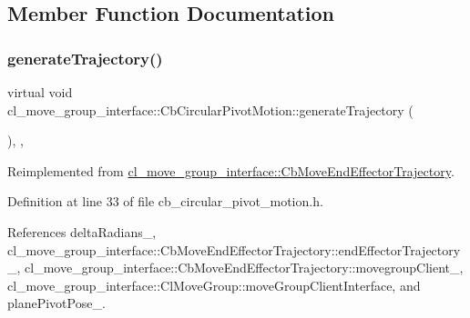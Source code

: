 \subsection{Member Function Documentation}
\mbox{\label{classcl__move__group__interface_1_1CbCircularPivotMotion_a7ff4ffd989cda695adc44a5a42eb3a18}} 
\subsubsection{\texorpdfstring{generate\+Trajectory()}{generateTrajectory()}}
{\footnotesize\ttfamily virtual void cl\+\_\+move\+\_\+group\+\_\+interface\+::\+Cb\+Circular\+Pivot\+Motion\+::generate\+Trajectory (\begin{DoxyParamCaption}{ }\end{DoxyParamCaption})\hspace{0.3cm}{\ttfamily [inline]}, {\ttfamily [override]}, {\ttfamily [virtual]}}



Reimplemented from \hyperlink{classcl__move__group__interface_1_1CbMoveEndEffectorTrajectory_aeae938ab66e18ab7d2fb2427bc83647b}{cl\+\_\+move\+\_\+group\+\_\+interface\+::\+Cb\+Move\+End\+Effector\+Trajectory}.



Definition at line 33 of file cb\+\_\+circular\+\_\+pivot\+\_\+motion.\+h.



References delta\+Radians\+\_\+, cl\+\_\+move\+\_\+group\+\_\+interface\+::\+Cb\+Move\+End\+Effector\+Trajectory\+::end\+Effector\+Trajectory\+\_\+, cl\+\_\+move\+\_\+group\+\_\+interface\+::\+Cb\+Move\+End\+Effector\+Trajectory\+::movegroup\+Client\+\_\+, cl\+\_\+move\+\_\+group\+\_\+interface\+::\+Cl\+Move\+Group\+::move\+Group\+Client\+Interface, and plane\+Pivot\+Pose\+\_\+.


